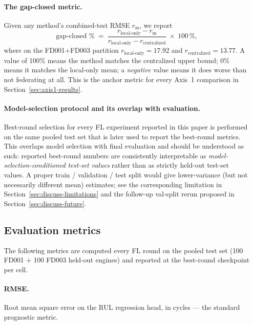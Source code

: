 \documentclass[preprint,12pt,authoryear]{elsarticle}
\begin{document}
\paragraph{The gap-closed metric.}
Given any method's combined-test RMSE $r_{\mathrm{m}}$, we report
\begin{equation}
    \text{gap-closed \%}
    \;=\; \frac{r_{\text{local-only}} - r_{\mathrm{m}}}
                {r_{\text{local-only}} - r_{\text{centralized}}}
    \;\times\; 100\,\%,
    \label{eq:gap-closed}
\end{equation}
where on the FD001+FD003 partition
$r_{\text{local-only}} = 17.92$ and
$r_{\text{centralized}} = 13.77$. A value of 100\% means the method
matches the centralized upper bound; 0\% means it matches the
local-only mean; a \emph{negative} value means it does worse than
not federating at all. This is the anchor metric for every Axis~1
comparison in Section~\ref{sec:axis1-results}.

\paragraph{Model-selection protocol and its overlap with evaluation.}
Best-round selection for every FL experiment reported in this paper
is performed on the same pooled test set that is later used to
report the best-round metrics. This overlaps model selection with
final evaluation and should be understood as such: reported
best-round numbers are consistently interpretable as
\emph{model-selection-conditioned test-set values} rather than as
strictly held-out test-set values. A proper train / validation /
test split would give lower-variance (but not necessarily different
mean) estimates; see the corresponding limitation in
Section~\ref{sec:discuss-limitations} and the follow-up val-split
rerun proposed in Section~\ref{sec:discuss-future}.

\subsection{Evaluation metrics}
\label{subsec:metrics}

The following metrics are computed every FL round on the pooled
test set (100 FD001 $+$ 100 FD003 held-out engines) and reported at
the best-round checkpoint per cell.

\paragraph{RMSE.}
Root mean square error on the RUL regression head, in cycles ---
the standard prognostic metric.
\end{document}

